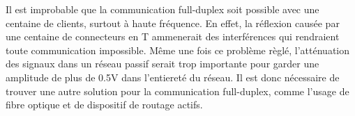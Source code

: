 Il est improbable que la communication full-duplex soit possible avec une centaine de clients, surtout à haute fréquence.
En effet, la réflexion causée par une centaine de connecteurs en T ammenerait des interférences qui rendraient toute communication impossible.
Même une fois ce problème règlé, l'atténuation des signaux dans un réseau passif serait trop importante pour garder une amplitude de plus de 0.5V dans l'entiereté du réseau.
Il est donc nécessaire de trouver une autre solution pour la communication full-duplex, comme l'usage de fibre optique et de dispositif de routage actifs.
